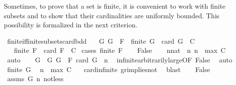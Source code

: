 \begin{isabellebody}
%
\begin{isamarkuptext}%
Sometimes, to prove that a set is finite, it is convenient to work with finite subsets
and to show that their cardinalities are uniformly bounded. This possibility is formalized in
the next criterion.%
\end{isamarkuptext}\isamarkuptrue%
\isamarkupfalse%
\ finite{\isacharunderscore}{\kern0pt}if{\isacharunderscore}{\kern0pt}finite{\isacharunderscore}{\kern0pt}subsets{\isacharunderscore}{\kern0pt}card{\isacharunderscore}{\kern0pt}bdd{\isacharcolon}{\kern0pt}\isanewline
\ \ \ {\isachardoublequoteopen}{\isasymAnd}G{\isachardot}{\kern0pt}\ G\ {\isasymsubseteq}\ F\ {\isasymLongrightarrow}\ finite\ G\ {\isasymLongrightarrow}\ card\ G\ {\isasymle}\ C{\isachardoublequoteclose}\isanewline
\ \ \ {\isachardoublequoteopen}finite\ F\ {\isasymand}\ card\ F\ {\isasymle}\ C{\isachardoublequoteclose}\isanewline
%
\isadelimproof
%
\endisadelimproof
%
\isatagproof
{}\isamarkupfalse%
\ {\isacharparenleft}{\kern0pt}cases\ {\isachardoublequoteopen}finite\ F{\isachardoublequoteclose}{\isacharparenright}{\kern0pt}\isanewline
\ \ \isamarkupfalse%
\ False\isanewline
\ \ \isamarkupfalse%
\ n{\isacharcolon}{\kern0pt}{\isacharcolon}{\kern0pt}nat\ \ n{\isacharcolon}{\kern0pt}\ {\isachardoublequoteopen}n\ {\isachargreater}{\kern0pt}\ max\ C\ {}{\isachardoublequoteclose}\ \isamarkupfalse%
\ auto\isanewline
\ \ \isamarkupfalse%
\ G\ \ G{\isacharcolon}{\kern0pt}\ {\isachardoublequoteopen}G\ {\isasymsubseteq}\ F{\isachardoublequoteclose}\ {\isachardoublequoteopen}card\ G\ {\isacharequal}{\kern0pt}\ n{\isachardoublequoteclose}\ \isamarkupfalse%
\ infinite{\isacharunderscore}{\kern0pt}arbitrarily{\isacharunderscore}{\kern0pt}large{\isacharbrackleft}{\kern0pt}OF\ False{\isacharbrackright}{\kern0pt}\ \isamarkupfalse%
\ auto\isanewline
\ \ \isamarkupfalse%
\ {\isachardoublequoteopen}finite\ G{\isachardoublequoteclose}\ \isamarkupfalse%
\ {\isacartoucheopen}n\ {\isachargreater}{\kern0pt}\ max\ C\ {}{\isacartoucheclose}\ \isamarkupfalse%
\ card{\isachardot}{\kern0pt}infinite\ gr{\isacharunderscore}{\kern0pt}implies{\isacharunderscore}{\kern0pt}not{}\ \isamarkupfalse%
\ blast\isanewline
\ \ \isamarkupfalse%
\ False\ \isamarkupfalse%
\ assms\ G\ n\ not{\isacharunderscore}{\kern0pt}less\ \isamarkupfalse%

\end{isabellebody}

